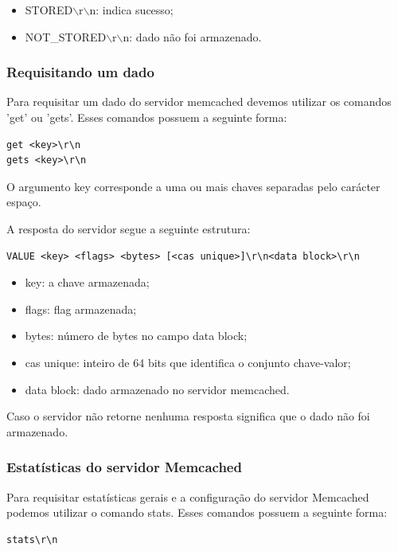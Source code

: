 \begin{itemize}
\item STORED$\backslash$r$\backslash$n: indica sucesso;
\item NOT\_STORED$\backslash$r$\backslash$n: dado não foi armazenado.
\end{itemize}

\subsubsection{Requisitando um dado}

Para requisitar um dado do servidor memcached devemos utilizar os comandos 'get' ou 'gets'. Esses comandos possuem a seguinte forma:

\begin{lstlisting}
get <key>\r\n
gets <key>\r\n
\end{lstlisting}


O argumento key corresponde a uma ou mais chaves separadas pelo carácter espaço.


A resposta do servidor segue a seguinte estrutura:

\begin{lstlisting}
VALUE <key> <flags> <bytes> [<cas unique>]\r\n<data block>\r\n
\end{lstlisting}

\begin{itemize}
\item key: a chave armazenada;
\item flags: flag armazenada;
\item bytes: número de bytes no campo data block;
\item cas unique: inteiro de 64 bits que identifica o conjunto chave-valor;
\item data block: dado armazenado no servidor memcached.
\end{itemize}

Caso o servidor não retorne nenhuma resposta significa que o dado não foi armazenado.

\subsubsection{Estatísticas do servidor Memcached}

Para requisitar estatísticas gerais e a configuração do servidor Memcached podemos utilizar o comando stats. Esses comandos possuem a seguinte forma:

\begin{lstlisting}
stats\r\n
\end{lstlisting}

